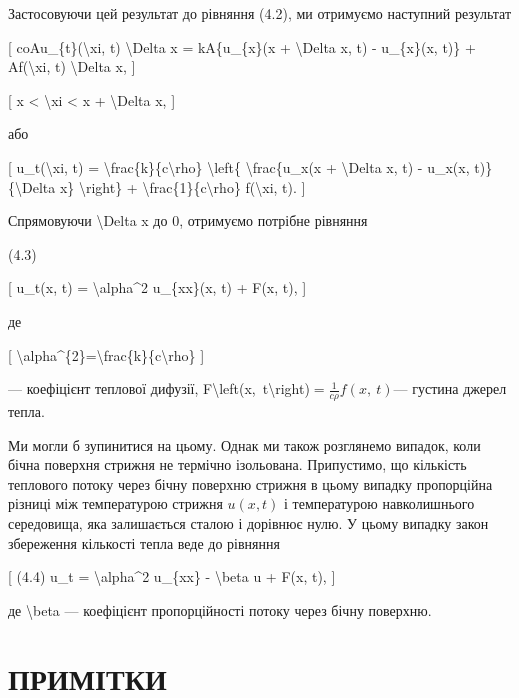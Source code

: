 \documentclass[
]{article}
\begin{document}
Застосовуючи цей результат до рівняння (4.2), ми отримуємо наступний
результат

{[} coAu\_\{t\}(\textbackslash xi, t) \textbackslash Delta x =
kA\{u\_\{x\}(x + \textbackslash Delta x, t) - u\_\{x\}(x, t)\} +
Af(\textbackslash xi, t) \textbackslash Delta x, {]}

{[} x \textless{} \textbackslash xi \textless{} x + \textbackslash Delta
x, {]}

або

{[} u\_t(\textbackslash xi, t) =
\textbackslash frac\{k\}\{c\textbackslash rho\} \textbackslash left\{
\textbackslash frac\{u\_x(x + \textbackslash Delta x, t) - u\_x(x,
t)\}\{\textbackslash Delta x\} \textbackslash right\} +
\textbackslash frac\{1\}\{c\textbackslash rho\} f(\textbackslash xi, t).
{]}

Спрямовуючи \textbackslash Delta x до 0, отримуємо потрібне рівняння

(4.3)

{[} u\_t(x, t) = \textbackslash alpha\^{}2 u\_\{xx\}(x, t) + F(x, t),
{]}

де

{[}
\textbackslash alpha\^{}\{2\}=\textbackslash frac\{k\}\{c\textbackslash rho\}
{]}

--- коефіцієнт теплової дифузії,
F\textbackslash left(x,~t\textbackslash right)\(=\frac{1}{c\rho}f\left(x,\ t\right)\)---
густина джерел тепла.

Ми могли б зупинитися на цьому. Однак ми також розглянемо випадок, коли
бічна поверхня стрижня не термічно ізольована. Припустимо, що кількість
теплового потоку через бічну поверхню стрижня в цьому випадку
пропорційна різниці між температурою стрижня \(u(x,t)\) і температурою
навколишнього середовища, яка залишається сталою і дорівнює нулю. У
цьому випадку закон збереження кількості тепла веде до рівняння

{[} (4.4) u\_t = \textbackslash alpha\^{}2 u\_\{xx\} -
\textbackslash beta u + F(x, t), {]}

де \textbackslash beta --- коефіцієнт пропорційності потоку через бічну
поверхню.

\section{ПРИМІТКИ}\label{ux43fux440ux438ux43cux456ux442ux43aux438}
\end{document}
